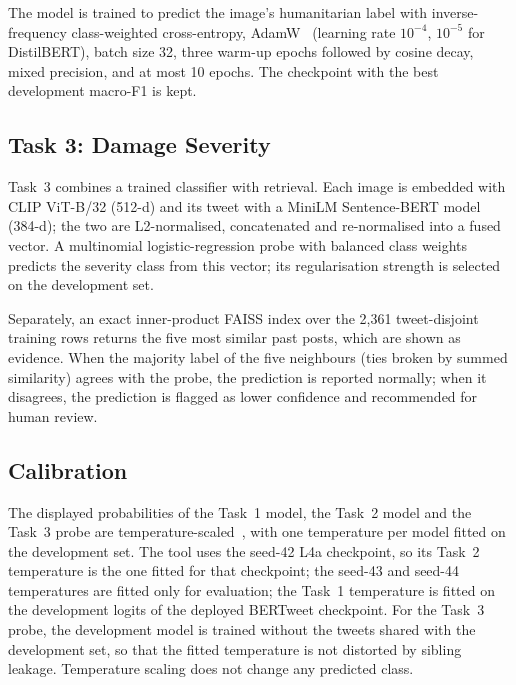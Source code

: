 \documentclass[conference]{IEEEtran}
\begin{document}
The model is trained to predict the image's humanitarian label with inverse-frequency class-weighted cross-entropy, AdamW~\cite{loshchilov2019} (learning rate $10^{-4}$, $10^{-5}$ for DistilBERT), batch size 32, three warm-up epochs followed by cosine decay, mixed precision, and at most 10 epochs. The checkpoint with the best development macro-F1 is kept.

\subsection{Task 3: Damage Severity}
Task~3 combines a trained classifier with retrieval. Each image is embedded with CLIP ViT-B/32 (512-d) and its tweet with a MiniLM Sentence-BERT model (384-d); the two are L2-normalised, concatenated and re-normalised into a fused vector. A multinomial logistic-regression probe with balanced class weights predicts the severity class from this vector; its regularisation strength is selected on the development set.

Separately, an exact inner-product FAISS index over the 2,361 tweet-disjoint training rows returns the five most similar past posts, which are shown as evidence. When the majority label of the five neighbours (ties broken by summed similarity) agrees with the probe, the prediction is reported normally; when it disagrees, the prediction is flagged as lower confidence and recommended for human review.

\subsection{Calibration}
The displayed probabilities of the Task~1 model, the Task~2 model and the Task~3 probe are temperature-scaled~\cite{guo2017}, with one temperature per model fitted on the development set. The tool uses the seed-42 L4a checkpoint, so its Task~2 temperature is the one fitted for that checkpoint; the seed-43 and seed-44 temperatures are fitted only for evaluation; the Task~1 temperature is fitted on the development logits of the deployed BERTweet checkpoint. For the Task~3 probe, the development model is trained without the tweets shared with the development set, so that the fitted temperature is not distorted by sibling leakage. Temperature scaling does not change any predicted class.
\end{document}
